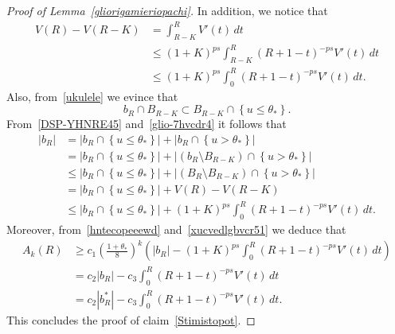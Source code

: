 \documentclass[12pt]{article}
\numberwithin{equation}{section}
\renewcommand{\leq}{\leqslant}
\renewcommand{\geq}{\geqslant}
\begin{document}
\begin{proof}[Proof of Lemma~\ref{gliorigamieriopachi}]
In addition, we  notice that 
\begin{equation}\label{DSP-YHNRE45}
\begin{split}
V(R)-V(R-K)&=\int_{R-K}^R V'(t)\,dt\\
&\leq (1+K)^{ps}\int_{R-K}^R \left(R+1-t\right)^{-ps}V'(t)\,dt\\
&\leq (1+K)^{ps}\int_{0}^R \left(R+1-t\right)^{-ps}V'(t)\,dt.
\end{split}
\end{equation} 
Also, from~\eqref{ukulele} we evince that
\begin{equation}\label{glio-7hvcdr4}
b_{R}\cap B_{R-K} \subset B_{R-K}\cap \left\lbrace u\leq \theta_* \right\rbrace.
\end{equation}
From~\eqref{DSP-YHNRE45} and~\eqref{glio-7hvcdr4} it follows that 
\begin{equation}\label{xucvedlgbvcr51}
\begin{split}
\left|b_R\right|& = \left|b_R\cap \left\lbrace u\leq \theta_* \right\rbrace \right|+\left|b_R\cap \left\lbrace u>\theta_*\right\rbrace\right|\\
&=\left|b_R\cap \left\lbrace u\leq \theta_* \right\rbrace \right|+\left|\left(b_R\setminus  B_{R-K}\right)  \cap \left\lbrace u>\theta_*\right\rbrace\right|\\
&\leq \left|b_R\cap \left\lbrace u\leq \theta_* \right\rbrace \right|+\left|\left(B_R\setminus B_{R-K}\right)  \cap \left\lbrace u>\theta_*\right\rbrace\right|\\
&= \left|b_R\cap \left\lbrace u\leq \theta_* \right\rbrace \right|+ V(R)-V(R-K)\\
&\leq \left|b_R\cap \left\lbrace u\leq \theta_* \right\rbrace \right|+ (1+K)^{ps}\int_{0}^R \left(R+1-t\right)^{-ps}V'(t)\,dt.
\end{split}
\end{equation}
Moreover, from~\eqref{hntecopeeewd} and~\eqref{xucvedlgbvcr51} we deduce that 
\begin{equation}\label{perthgtbgf}
\begin{split}
A_k(R)&\geq c_1\left(\frac{1+\theta_*}{8}\right)^k \left( \left|b_R\right|-(1+K)^{ps}\int_{0}^R(R+1-t)^{-ps}V'(t)\,dt\right)\\ 
&=c_2\left|b_R \right|-c_3\int_{0}^R(R+1-t)^{-ps}V'(t)\,dt\\
&=c_2\left|b_R^*\right|-c_3\int_{0}^R (R+1-t)^{-ps}V'(t)\,dt. 
\end{split}
\end{equation}
This concludes the proof of claim~\eqref{Stimistopot}. 


\end{proof}
\end{document}
